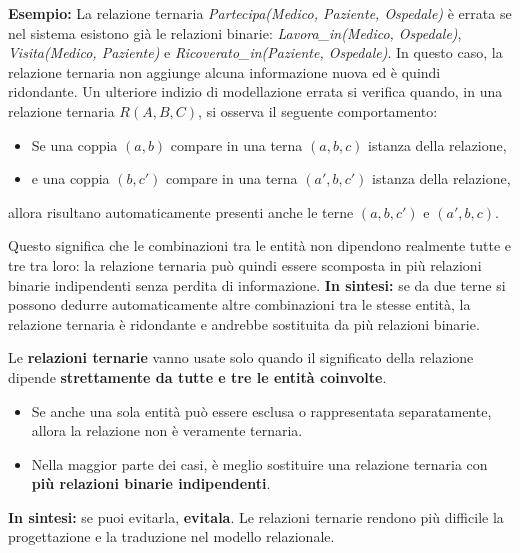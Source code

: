 \noindent
\textbf{Esempio:}  
La relazione ternaria \emph{Partecipa(Medico, Paziente, Ospedale)} è errata se nel sistema esistono già le relazioni binarie:  
\emph{Lavora\_in(Medico, Ospedale)}, \emph{Visita(Medico, Paziente)} e \emph{Ricoverato\_in(Paziente, Ospedale)}.  
In questo caso, la relazione ternaria non aggiunge alcuna informazione nuova ed è quindi ridondante.
\noindent
Un ulteriore indizio di modellazione errata si verifica quando, in una relazione ternaria $R(A, B, C)$, si osserva il seguente comportamento:

\begin{itemize}
    \item Se una coppia $(a,b)$ compare in una terna $(a,b,c)$ istanza della relazione,  
    \item e una coppia $(b,c')$ compare in una terna $(a',b,c')$ istanza della relazione,
\end{itemize}

allora risultano automaticamente presenti anche le terne $(a,b,c')$ e $(a',b,c)$.

\noindent
Questo significa che le combinazioni tra le entità non dipendono realmente tutte e tre tra loro:  
la relazione ternaria può quindi essere scomposta in più relazioni binarie indipendenti senza perdita di informazione.
\noindent
\textbf{In sintesi:} se da due terne si possono dedurre automaticamente altre combinazioni tra le stesse entità,  
la relazione ternaria è ridondante e andrebbe sostituita da più relazioni binarie.

\begin{tcolorbox}[colback=yellow!15!white, colframe=orange!80!black, title=\textbf{Kristian semplifica in questo modo}]
Le \textbf{relazioni ternarie} vanno usate solo quando il significato della relazione dipende \textbf{strettamente da tutte e tre le entità coinvolte}.  

\begin{itemize}
    \item Se anche una sola entità può essere esclusa o rappresentata separatamente, allora la relazione non è veramente ternaria.  
    \item Nella maggior parte dei casi, è meglio sostituire una relazione ternaria con \textbf{più relazioni binarie indipendenti}.
\end{itemize}

\noindent
\textbf{In sintesi:}  
se puoi evitarla, \textbf{evitala}. Le relazioni ternarie rendono più difficile la progettazione e la traduzione nel modello relazionale.
\end{tcolorbox}
